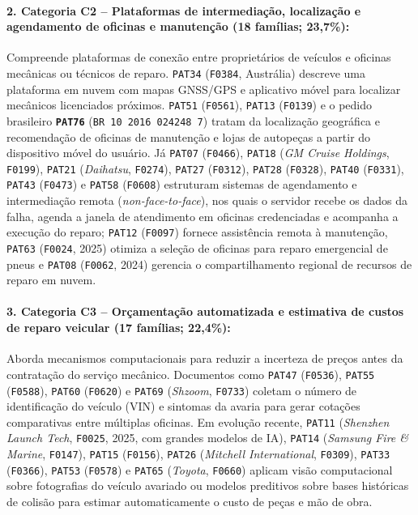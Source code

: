 \documentclass[12pt,a4paper]{article}
\begin{document}
\paragraph{2. Categoria C2 -- Plataformas de intermediação, localização e agendamento de oficinas e manutenção (18 famílias; 23,7\%):}
Compreende plataformas de conexão entre proprietários de veículos e oficinas mecânicas ou técnicos de reparo. \texttt{PAT34} (\texttt{F0384}, Austrália) descreve uma plataforma em nuvem com mapas GNSS/GPS e aplicativo móvel para localizar mecânicos licenciados próximos. \texttt{PAT51} (\texttt{F0561}), \texttt{PAT13} (\texttt{F0139}) e o pedido brasileiro \textbf{\texttt{PAT76}} (\texttt{BR 10 2016 024248 7}) tratam da localização geográfica e recomendação de oficinas de manutenção e lojas de autopeças a partir do dispositivo móvel do usuário. Já \texttt{PAT07} (\texttt{F0466}), \texttt{PAT18} (\textit{GM Cruise Holdings}, \texttt{F0199}), \texttt{PAT21} (\textit{Daihatsu}, \texttt{F0274}), \texttt{PAT27} (\texttt{F0312}), \texttt{PAT28} (\texttt{F0328}), \texttt{PAT40} (\texttt{F0331}), \texttt{PAT43} (\texttt{F0473}) e \texttt{PAT58} (\texttt{F0608}) estruturam sistemas de agendamento e intermediação remota (\textit{non-face-to-face}), nos quais o servidor recebe os dados da falha, agenda a janela de atendimento em oficinas credenciadas e acompanha a execução do reparo; \texttt{PAT12} (\texttt{F0097}) fornece assistência remota à manutenção, \texttt{PAT63} (\texttt{F0024}, 2025) otimiza a seleção de oficinas para reparo emergencial de pneus e \texttt{PAT08} (\texttt{F0062}, 2024) gerencia o compartilhamento regional de recursos de reparo em nuvem.

\paragraph{3. Categoria C3 -- Orçamentação automatizada e estimativa de custos de reparo veicular (17 famílias; 22,4\%):}
Aborda mecanismos computacionais para reduzir a incerteza de preços antes da contratação do serviço mecânico. Documentos como \texttt{PAT47} (\texttt{F0536}), \texttt{PAT55} (\texttt{F0588}), \texttt{PAT60} (\texttt{F0620}) e \texttt{PAT69} (\textit{Shzoom}, \texttt{F0733}) coletam o número de identificação do veículo (VIN) e sintomas da avaria para gerar cotações comparativas entre múltiplas oficinas. Em evolução recente, \texttt{PAT11} (\textit{Shenzhen Launch Tech}, \texttt{F0025}, 2025, com grandes modelos de IA), \texttt{PAT14} (\textit{Samsung Fire \& Marine}, \texttt{F0147}), \texttt{PAT15} (\texttt{F0156}), \texttt{PAT26} (\textit{Mitchell International}, \texttt{F0309}), \texttt{PAT33} (\texttt{F0366}), \texttt{PAT53} (\texttt{F0578}) e \texttt{PAT65} (\textit{Toyota}, \texttt{F0660}) aplicam visão computacional sobre fotografias do veículo avariado ou modelos preditivos sobre bases históricas de colisão para estimar automaticamente o custo de peças e mão de obra.
\end{document}
